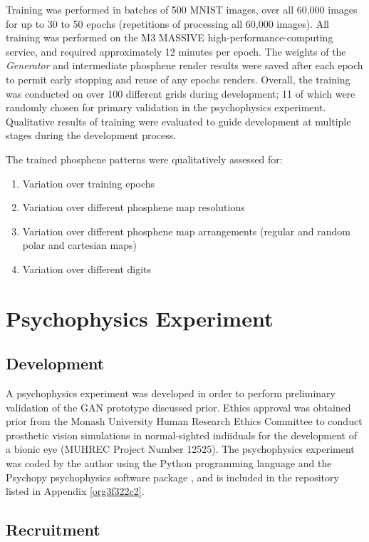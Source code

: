 \documentclass[a4paper,11pt,openany]{book}
\begin{document}
Training was performed in batches of 500 MNIST images, over all 60,000 images for up to 30 to 50 epochs (repetitions of processing all 60,000 images).
All training was performed on the M3 MASSIVE high-performance-computing service, and required approximately 12 minutes per epoch.
The weights of the \emph{Generator} and intermediate phosphene render results were saved after each epoch to permit early stopping and reuse of any epochs renders.
Overall, the training was conducted on over 100 different grids during development; 11 of which were randomly chosen for primary validation in the psychophysics experiment.
Qualitative results of training were evaluated to guide development at multiple stages during the development process.

The trained phosphene patterns were qualitatively assessed for:

\begin{enumerate}
\item Variation over training epochs
\item Variation over different phosphene map resolutions
\item Variation over different phosphene map arrangements (regular and random polar and cartesian maps)
\item Variation over different digits
\end{enumerate}

\chapter{Psychophysics Experiment}
\label{sec:orga9e58f6}
\section*{Development}
\label{sec:org4fcd049}

A psychophysics experiment was developed in order to perform preliminary validation of the GAN prototype discussed prior.
Ethics approval was obtained prior from the Monash University Human Research Ethics Committee to conduct prosthetic vision simulations in normal-sighted indiiduals for the development of a bionic eye (MUHREC Project Number 12525).
The psychophysics experiment was coded by the author using the Python programming language and the Psychopy psychophysics software package \cite{Peirce2019}, and is included in the repository listed in Appendix \ref{org3f322c2}.

\section*{Recruitment}
\label{sec:orga7831b3}
\end{document}
